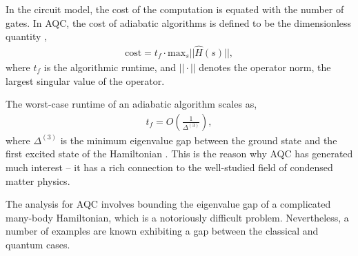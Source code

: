 In the circuit model, the cost of the computation is equated with the number of gates. In AQC, the cost of adiabatic algorithms is defined to be the dimensionless quantity \cite{bib:aharonov2008adiabatic},
\begin{align}
\mathrm{cost} = t_f \cdot \mathrm{max}_s ||\hat{H}(s)||,
\end{align}
where $t_f$ is the algorithmic runtime, and $||\cdot||$ denotes the operator norm, the largest singular value of the operator.
 
The worst-case runtime of an adiabatic algorithm scales as,
\begin{align}
t_f = O\left(\frac{1}{\Delta^{(3)}}\right), 
\end{align}
where $\Delta^{(3)}$ is the minimum eigenvalue gap between the ground state and the first excited state of the Hamiltonian \cite{bib:jansen2007bounds}. This is the reason why AQC has generated much interest -- it has a rich connection to the well-studied field of condensed matter physics.

The analysis for AQC involves bounding the eigenvalue gap of a complicated many-body Hamiltonian, which is a notoriously difficult problem. Nevertheless, a number of examples are known exhibiting a gap between the classical and quantum cases. 

